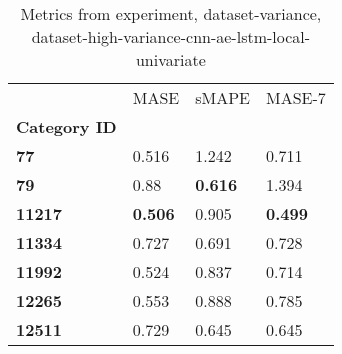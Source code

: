\begin{table}[H]
\centering
\caption{Metrics from experiment, dataset-variance, dataset-high-variance-cnn-ae-lstm-local-univariate}
\label{table:dataset-high-variance-cnn-ae-lstm-local-univariate-dataset-variance}
\begin{tabular}{llll}
\toprule
{} &            MASE &           sMAPE &          MASE-7 \\
\textbf{Category ID} &                 &                 &                 \\
\midrule
\textbf{77         } &           0.516 &           1.242 &           0.711 \\
\textbf{79         } &            0.88 &  \textbf{0.616} &           1.394 \\
\textbf{11217      } &  \textbf{0.506} &           0.905 &  \textbf{0.499} \\
\textbf{11334      } &           0.727 &           0.691 &           0.728 \\
\textbf{11992      } &           0.524 &           0.837 &           0.714 \\
\textbf{12265      } &           0.553 &           0.888 &           0.785 \\
\textbf{12511      } &           0.729 &           0.645 &           0.645 \\
\bottomrule
\end{tabular}
\end{table}
